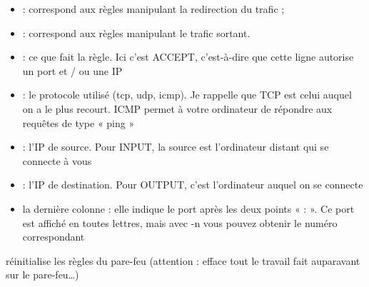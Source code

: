 \documentclass[letterpaper,10pt,french]{sphinxmanual}
\begin{document}
\begin{description}
\begin{itemize}
\item {} 
 : correspond aux règles manipulant la redirection du trafic ;

\item {} 
 : correspond aux règles manipulant le trafic sortant.

\item {} 
 : ce que fait la règle. Ici c’est ACCEPT, c’est-à-dire que cette ligne autorise un port et / ou une IP

\item {} 
 : le protocole utilisé (tcp, udp, icmp). Je rappelle que TCP est celui auquel on a le plus recourt. ICMP permet à votre ordinateur de répondre aux requêtes de type « ping »

\item {} 
 : l’IP de source. Pour INPUT, la source est l’ordinateur distant qui se connecte à vous

\item {} 
 : l’IP de destination. Pour OUTPUT, c’est l’ordinateur auquel on se connecte

\item {} 
la dernière colonne : elle indique le port après les deux points « : ». Ce port est affiché en toutes lettres, mais avec -n vous pouvez obtenir le numéro correspondant

\end{itemize}

\item[{\sphinxcode{\sphinxupquote{iptables -F}}}] \leavevmode
réinitialise les règles du pare-feu (attention : efface tout le travail fait auparavant sur le pare-feu…)

\end{description}
\end{document}
